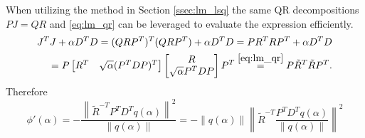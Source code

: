 When utilizing the method in Section \ref{ssec:lm_lsq} the same QR decompositions $PJ = QR$ and \eqref{eq:lm_qr} can be leveraged to evaluate the expression efficiently.
\begin{equation}
  \begin{aligned}
    J^{T} J + \alpha D^{T} D = (QRP^{T})^{T} (QRP^{T}) + \alpha D^{T} D = P R^{T} R P^{T} + \alpha D^{T} D \\
    = P \begin{bmatrix} R^{T} & \sqrt{\alpha} (P^{T} D P)^{T} \end{bmatrix}\begin{bmatrix} R \\ \sqrt{\alpha} P^{T} D P \end{bmatrix} P^{T} \overset{\eqref{eq:lm_qr}}{=} P \tilde R^{T} \tilde R P^{T}.
  \end{aligned}
\end{equation}
Therefore
\begin{equation}
  \phi'(\alpha) = - \frac{\left\| \tilde R^{-T} P^{T} D^{T} q(\alpha) \right\|^{2}}{\| q(\alpha) \|} = - \| q(\alpha) \| \left\| \tilde R^{-T} \frac{P^{T} D^{T} q(\alpha) }{\| q(\alpha) \|} \right\|^{2}
\end{equation}


